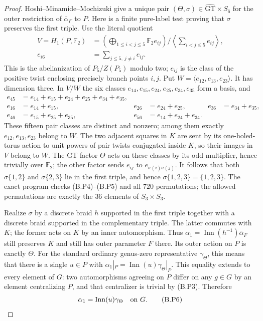 \begin{proof}
Hoshi--Minamide--Mochizuki give a unique pair
$(\Theta,\sigma)\in\widehat{\mathrm{GT}}\times S_6$ for the
outer restriction of $\bar\alpha_F$ to $P$.
Here is a finite pure-label test proving that $\sigma$ preserves
the first triple. Use the literal quotient
\[
\begin{aligned}
 V=H_1(P,\mathbb F_2)
  &=\left(\bigoplus_{1\leq i<j\leq5}\mathbb F_2 e_{ij}\right)
       \Big/\left\langle\sum_{i<j\leq5}e_{ij}\right\rangle,\\
 e_{i6}&=\sum_{j\leq5,\ j\ne i}e_{ij}.
\end{aligned}                                             \tag{B.P4}
\]
This is the abelianization of $P_5/Z(P_5)$ modulo two; $e_{ij}$ is
the class of the positive twist enclosing precisely branch points
$i,j$. Put $W=\langle e_{12},e_{13},e_{23}\rangle$.
It has dimension three. In $V/W$ the six classes
$e_{14},e_{15},e_{24},e_{25},e_{34},e_{35}$ form a basis, and
\[
\begin{aligned}
 e_{45}&=e_{14}+e_{15}+e_{24}+e_{25}+e_{34}+e_{35},\\
 e_{16}&=e_{14}+e_{15},&e_{26}&=e_{24}+e_{25},
       &e_{36}&=e_{34}+e_{35},\\
 e_{46}&=e_{15}+e_{25}+e_{35},
       &e_{56}&=e_{14}+e_{24}+e_{34}.
\end{aligned}                                                   \tag{B.P5}
\]
These fifteen pair classes are distinct and nonzero; among them
exactly $e_{12},e_{13},e_{23}$ belong to $W$.
The two adjacent squares in $K$ are sent by its
one-holed-torus action to unit powers of pair twists conjugated
inside $K$, so their images in $V$ belong to $W$.
The GT factor $\Theta$ acts on these classes by its odd multiplier,
hence trivially over $\mathbb F_2$; the other factor sends
$e_{ij}$ to $e_{\sigma(i)\sigma(j)}$.
It follows that both $\sigma\{1,2\}$ and $\sigma\{2,3\}$ lie
in the first triple, and hence
$\sigma\{1,2,3\}=\{1,2,3\}$.
The exact program  checks
(B.P4)--(B.P5) and all $720$ permutations; the allowed permutations
are exactly the $36$ elements of $S_3\times S_3$.

Realize $\sigma$ by a discrete braid $h$ supported in the first
triple together with a discrete braid supported in the complementary
triple. The latter commutes with $K$; the former acts on $K$ by
an inner automorphism. Thus
$\alpha_1=\operatorname{Inn}(h^{-1})\bar\alpha_F$ still preserves
$K$ and still has outer parameter $F$ there. Its outer action on
$P$ is exactly $\Theta$. For the standard ordinary genus-zero
representative $\gamma_\Theta$, this means that there is a single
$u\in P$ with
$\alpha_1|_P=\operatorname{Inn}(u)\gamma_\Theta|_P$.
This equality extends to every element of $G$: two automorphisms
agreeing on $P$ differ on any $g\in G$ by an element centralizing
$P$, and that centralizer is trivial by (B.P3). Therefore
\[
                  \alpha_1=\operatorname{Inn}(u)\gamma_\Theta
                         \quad\hbox{on }G.                \tag{B.P6}
\]


\end{proof}
